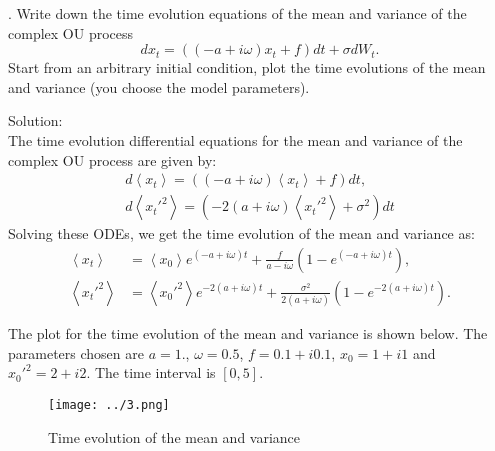 \documentclass[a4paper,notitlepage,cs4size,cap,indent,oneside,12pt]{article}
\numberwithin{equation}{section}
\numberwithin{figure}{section}
\newcommand{\blue}{\color{blue}}
\newcommand{\innp}[1]{\left\langle #1 \right\rangle}
\begin{document}
. Write down the time evolution equations of the mean and variance of the complex OU process
\begin{equation*}
    dx_t = ((-a+i\omega)x_t + f)dt + \sigma dW_t.
\end{equation*}
Start from an arbitrary initial condition, plot the time evolutions of the mean and variance (you choose the model parameters).

{\blue
\noindent Solution: \\
The time evolution differential equations for the mean and variance of the complex OU process are given by:
\begin{align*}
  d\innp{x_t} = \left((-a+i\omega)\innp{x_t} + f\right)dt,\\
  d\innp{{x_t'^2}} = \left(-2(a + i\omega)\innp{x_t'^2} + \sigma^2 \right)dt
\end{align*}
Solving these ODEs, we get the time evolution of the mean and variance as:
\begin{align*}
  \innp{x_t} &= \innp{x_0}e^{(-a+i\omega)t} + \frac{f}{a - i\omega}(1 - e^{(-a+i\omega)t}),\\
  \innp{x_t'^2} &= \innp{x_0'^2}e^{-2(a+i\omega)t} + \frac{\sigma^2}{2(a+i\omega)}(1 - e^{-2(a+i\omega)t}).
\end{align*}

The plot for the time evolution of the mean and variance is shown below. The parameters chosen are $a = 1.$, $\omega = 0.5$, $f = 0.1 + i0.1$, $x_0 = 1 + i1$ and $x_0'^2 = 2 + i2$. The time interval is $[0, 5]$.

\begin{figure}[H]
  \centering
  \texttt{[image: ../3.png]}
  \caption{Time evolution of the mean and variance}
\end{figure}

}
\end{document}
